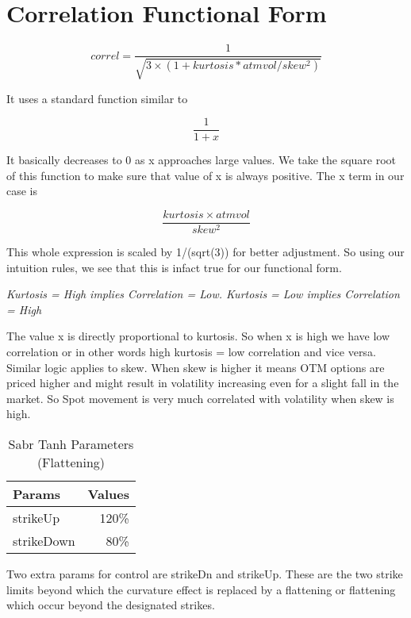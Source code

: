 \documentclass[a4paper, 12pt]{article}
\begin{document}
\section{Correlation Functional Form}

\normalfont
\begin{equation}
correl = \frac{1}{\sqrt{3 \times ( 1 + kurtosis*atmvol/skew^2)}  }
\end{equation}

It uses a standard function similar to 

\begin{equation} 
\frac{1}{1+x} 
\end{equation}

It basically decreases to 0 as x approaches large values. We take the square root of this function to make sure that value of x is always positive. The x term in our case is 

\begin{equation}
\frac{kurtosis \times atmvol}{skew^2}
\end{equation}

This whole expression is scaled by 1/(sqrt(3)) for better adjustment. 
So using our intuition rules, we see that this is infact true for our functional form.

\emph{
Kurtosis = High implies Correlation = Low. 
Kurtosis = Low implies  Correlation = High
}

The value x is directly proportional to kurtosis. So when x is high we have low correlation or in other words high kurtosis = low correlation and vice versa. 
Similar logic applies to skew. When skew is higher it means OTM options are priced higher and might result in volatility increasing even for a slight fall in the market. So Spot movement is very much correlated with volatility when skew is high. 

\begin{table}[h]
\centering
\begin{tabular}{l|r}
Params & Values \\\hline
strikeUp & 120\% \\
strikeDown & 80\% \\
\end{tabular}
\caption{\label{tab:flatParams}Sabr Tanh Parameters (Flattening)}
\end{table}

Two extra params for control are strikeDn and strikeUp. These are the two strike limits beyond which the curvature effect is replaced by a flattening or flattening which occur beyond the designated strikes.
\end{document}
